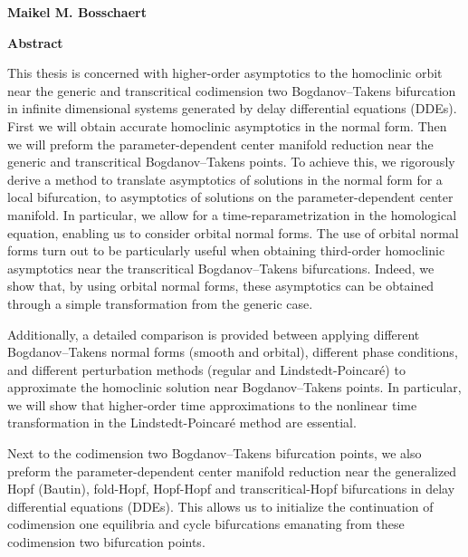 \thispagestyle{plain}
\begin{center}
    \Large
    \textbf{\thesistitle}
        
    \vspace{0.4cm}
    \large
    \thesissubtitle
        
    \vspace{0.4cm}
    \textbf{Maikel M. Bosschaert}
       
    \vspace{0.9cm}
    \textbf{Abstract}
\end{center}
This thesis is concerned with higher-order asymptotics to the homoclinic orbit
near the generic and transcritical codimension two Bogdanov--Takens bifurcation
in infinite dimensional systems generated by delay differential equations (DDEs).
First we will obtain accurate homoclinic asymptotics in the normal form. Then we
will preform the parameter-dependent center manifold reduction near the generic
and transcritical Bogdanov--Takens points. To achieve this, we rigorously derive
a method to translate asymptotics of solutions in the normal form for a local
bifurcation, to asymptotics of solutions on the parameter-dependent center
manifold. In particular, we allow for a time-reparametrization in the homological
equation, enabling us to consider orbital normal forms. The use of orbital normal
forms turn out to be particularly useful when obtaining third-order homoclinic
asymptotics near the transcritical Bogdanov--Takens bifurcations. Indeed, we show
that, by using orbital normal forms, these asymptotics can be obtained through a
simple transformation from the generic case.

Additionally, a detailed comparison is provided between applying different
Bogdanov--Takens normal forms (smooth and orbital), different phase conditions,
and different perturbation methods (regular and Lindstedt-Poincar\'e) to
approximate the homoclinic solution near Bogdanov--Takens points. In particular,
we will show that higher-order time approximations to the nonlinear time
transformation in the Lindstedt-Poincar\'e method are essential. 

Next to the codimension two Bogdanov--Takens bifurcation points, we also
preform the parameter-dependent center manifold reduction near the generalized
Hopf (Bautin), fold-Hopf, Hopf-Hopf and transcritical-Hopf bifurcations in
delay differential equations (DDEs). This allows us to initialize the
continuation of codimension one equilibria and cycle bifurcations emanating
from these codimension two bifurcation points.

